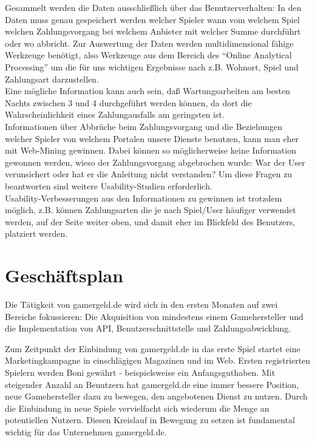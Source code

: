 \documentclass[a4paper,10pt]{article}
\begin{document}
Gesammelt werden die Daten ausschließlich über das Benutzerverhalten:
In den Daten muss genau gespeichert werden welcher Spieler wann vom welchem Spiel welchen Zahlungsvorgang bei welchem Anbieter mit welcher Summe durchführt oder wo abbricht.
Zur Auswertung der Daten werden multidimensional fähige Werkzeuge benötigt, also Werkzeuge aus dem Bereich des "`Online Analytical Processing"' um die für uns wichtigen Ergebnisse
nach z.B. Wohnort, Spiel und Zahlungsart darzustellen.\\
Eine mögliche Information kann auch sein, daß Wartungsarbeiten am besten Nachts zwischen 3 und 4 durchgeführt werden können, da dort die Wahrscheinlichkeit eines Zahlungausfalls am geringsten ist.\\
Informationen über Abbrüche beim Zahlungsvorgang und die Beziehungen welcher Spieler von welchem Portalen unsere Dienste benutzen, kann man eher mit Web-Mining gewinnen.
Dabei können so möglicherweise keine Information gewonnen werden, wieso der Zahlungsvorgang abgebrochen wurde: War der User verunsichert oder hat er die Anleitung nicht verstanden?
Um diese Fragen zu beantworten sind weitere Usability-Studien erforderlich.\\
Usability-Verbesserungen aus den Informationen zu gewinnen ist trotzdem möglich, z.B. können Zahlungsarten die je nach Spiel/User häufiger verwendet werden, auf der Seite weiter oben, und damit eher im Blickfeld des Benutzers, platziert werden.

\section{Geschäftsplan}\label{labelGeschaeftsplan}
Die Tätigkeit von gamergeld.de wird sich in den ersten Monaten auf zwei Bereiche fokussieren: Die Akquisition von mindestens einem Gamehersteller und die Implementation von API, Benutzerschnittstelle und Zahlungsabwicklung.

Zum Zeitpunkt der Einbindung von gamergeld.de in das erste Spiel startet eine Marketingkampagne in einschlägigen Magazinen und im Web.
Ersten registrierten Spielern werden Boni gewährt - beispielsweise ein Anfangsguthaben.
Mit steigender Anzahl an Benutzern hat gamergeld.de eine immer bessere Position, neue Gamehersteller dazu zu bewegen, den angebotenen Dienst zu nutzen.
Durch die Einbindung in neue Spiele vervielfacht sich wiederum die Menge an potentiellen Nutzern.
Diesen Kreislauf in Bewegung zu setzen ist fundamental wichtig für das Unternehmen gamergeld.de.





\end{document}
